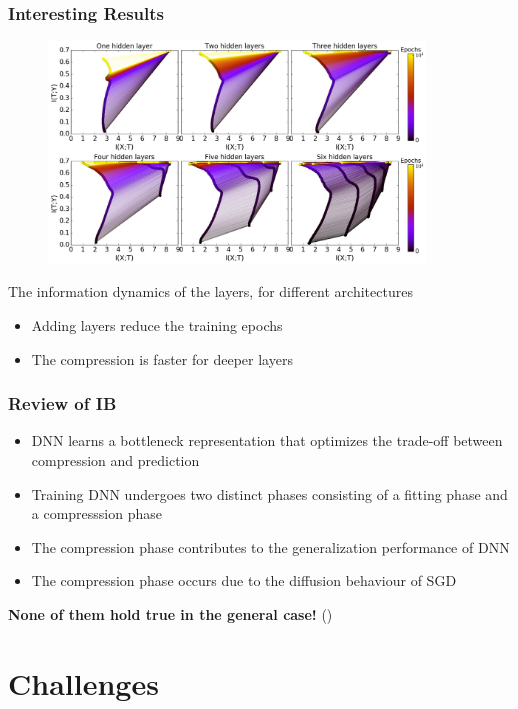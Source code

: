 \documentclass[notes]{beamer}
\begin{document}
\begin{frame}
    \frametitle{Interesting Results}
    \vspace{-0.25cm}
    \begin{figure}
        \centering
        \includegraphics[width=10cm]{info_plane_layers.jpg}
    \end{figure}
    \vspace{-0.4cm}
    The information dynamics of the layers, for different architectures
    \begin{itemize}
        \item Adding layers reduce the training epochs
        \item The compression is faster for deeper layers
    \end{itemize}
\end{frame}

\begin{frame}
    \frametitle{Review of IB}
    \begin{itemize}
        \item DNN learns a bottleneck representation that optimizes the trade-off between compression and prediction
        \item Training DNN undergoes two distinct phases consisting of a fitting phase and a compresssion phase
        \item The compression phase contributes to the generalization performance of DNN
        \item The compression phase occurs due to the diffusion behaviour of SGD
    \end{itemize}
    \vspace{1cm}
    \centering
    \pause \textbf{None of them hold true in the general case!} (\cite{IB-challenge})

\end{frame}

\section{Challenges}
\end{document}
